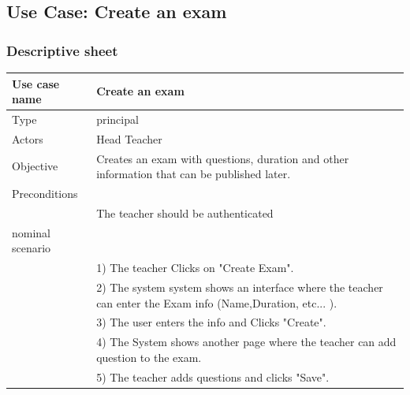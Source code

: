 \documentclass[]{uc2pfecaneva}
\begin{document}
\begin{table}[h]
	\raggedright\subsection{Use Case: Create an exam}
	\subsubsection{Descriptive sheet}
	\centering
	\begin{tabularx}{\textwidth}{|l|X|}
		\hline
		Use case name         & Create an exam                                                                                              \\ \hline
		Type                  & principal                                                                                                   \\ \hline
		Actors                & Head Teacher                                                                                                \\ \hline
		Objective             & Creates an exam with questions, duration and other information that can be published later.                 \\ \hline
		Preconditions         &                                                                                                             \\
		                      & The teacher should be authenticated                                                                         \\ \hline
		nominal scenario      &                                                                                                             \\
		                      & 1) The teacher Clicks on "Create Exam".                                                                     \\
		                      & 2) The system system shows an interface where the teacher can enter the Exam info (Name,Duration, etc... ). \\
		                      & 3) The user enters the info and Clicks "Create".                                                            \\
		                      & 4) The System shows another page where the teacher can add question to the exam.                            \\
		                      & 5) The teacher  adds questions and clicks "Save".                                                           \\ \hline

\end{tabularx}
\end{table}
\end{document}
